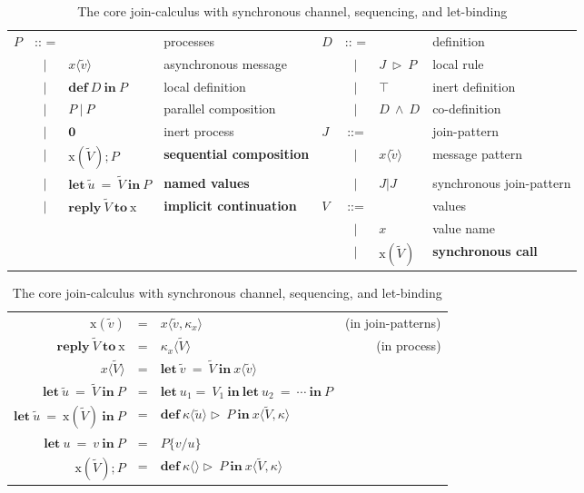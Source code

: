 \begin{table} [h]
  \begin{center}
  \begin{tabular}{ l c l  l l c l  p{\textwidth} }
$P$  & :: =  &                                               & processes                      &$D$& :: =  & & definition \\
 & $|$ & $x \langle \widetilde{v} \rangle $   & asynchronous message &&$|$&$J\ \triangleright \ P$&local rule\\
 & $|$ & $ \mathbf{def}\ D\ \mathbf{in}\ P$ & local definition                &&$|$&$\top$             & inert definition\\
 & $|$ & $P\ |\ P$                                        & parallel composition       &&$|$&$D\ \wedge \ D$&co-definition\\
 & $|$ & $\mathbf{0}$                                 & inert process                  &$J$& ::= & &join-pattern\\
 & $|$ & $\mathrm{x}(\widetilde{V});P$       & \bf{sequential composition} &&$|$& $x\langle\widetilde{v}\rangle$ & message pattern\\
 & $|$ & $\mathbf{let}\ \widetilde{u}\ =\ \widetilde{V}\ \mathbf{in}\ P$& \bf{named values} &&$|$&$J|J$&synchronous join-pattern\\
 & $|$ & $\mathbf{reply}\  \widetilde{V}\ \mathbf{to}\ \mathrm{x}$     & \bf{implicit continuation} &$V$& ::= & &values\\
 &&&&&$|$&$x$& value name\\
 &&&&&$|$&$\mathrm{x}(\widetilde{V})$& \bf{synchronous call}\\
  \end{tabular}
  \begin{tabular}{ r c l  r }
\\
    $\mathrm{x}(\widetilde{v})$&=&$x\langle \widetilde{v},\kappa_x\rangle$&(in join-patterns)\\
    $\mathbf{reply}\  \widetilde{V}\ \mathbf{to}\ \mathrm{x}$&=&$\kappa_x\langle\widetilde{V}\rangle$&(in process)
    \\
    $x\langle\widetilde{V}\rangle$&=&$\mathbf{let}\ \widetilde{v}\ =\ \widetilde{V}\ \mathbf{in}\ x\langle\widetilde{v}\rangle$\\
    $\mathbf{let}\ \widetilde{u}\ =\ \widetilde{V}\ \mathbf{in}\ P$&=&$\mathbf{let}\ u_1=\ V_1\ \mathbf{in\ let}\ u_2\ = \ \cdots\ \mathbf{in}\ P$\\
    $\mathbf{let}\ \widetilde{u}\ =\ \mathrm{x}(\widetilde{V})\ \mathbf{in}\ P$&=&$\mathbf{def}\ \kappa\langle\widetilde{u}\rangle\triangleright\ P\ \mathbf{in}\ x\langle\widetilde{V},\kappa\rangle$\\
    $\mathbf{let}\ u\ =\ v\ \mathbf{in}\ P$&=&$P\{v/u\}$\\
    $\mathrm{x}(\widetilde{V});P$&=&$\mathbf{def}\ \kappa\langle\rangle\triangleright\ P\ \mathbf{in}\ x\langle\widetilde{V},\kappa\rangle$

  \end{tabular}
  \end{center}
  \caption{The core join-calculus with synchronous channel, sequencing, and let-binding}
  \label{join_syn_chan}
\end{table}



